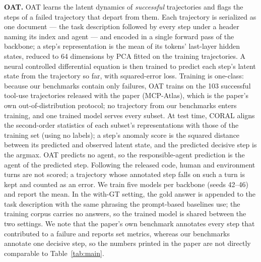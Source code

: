 \textbf{OAT.}
OAT learns the latent dynamics of \emph{successful} trajectories and flags the
steps of a failed trajectory that depart from them. Each trajectory is
serialized as one document --- the task description followed by every step under
a header naming its index and agent --- and encoded in a single forward pass of
the backbone; a step's representation is the mean of its tokens' last-layer
hidden states, reduced to 64 dimensions by PCA fitted on the training
trajectories. A neural controlled differential equation is then trained to
predict each step's latent state from the trajectory so far, with squared-error
loss. Training is one-class: because our benchmarks contain only failures, OAT
trains on the 103 successful tool-use trajectories released with the paper
(MCP-Atlas), which is the paper's own out-of-distribution protocol; no
trajectory from our benchmarks enters training, and one trained model serves
every subset. At test time, CORAL aligns the second-order statistics of each
subset's representations with those of the training set (using no labels); a
step's anomaly score is the squared distance between its predicted and observed
latent state, and the predicted decisive step is the argmax. OAT predicts no
agent, so the responsible-agent prediction is the agent of the predicted step.
Following the released code, human and environment turns are not scored; a
trajectory whose annotated step falls on such a turn is kept and counted as an
error. We train five models per backbone (seeds 42--46) and report the mean. In
the with-GT setting, the gold answer is appended to the task description with
the same phrasing the prompt-based baselines use; the training corpus carries no
answers, so the trained model is shared between the two settings. We note that
the paper's own benchmark annotates every step that contributed to a failure and
reports set metrics, whereas our benchmarks annotate one decisive step, so the
numbers printed in the paper are not directly comparable to
Table~\ref{tab:main}.

